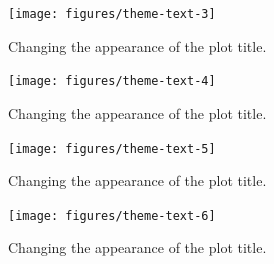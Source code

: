 \begin{figure}
\texttt{[image: figures/theme-text-3]} \caption{Changing the appearance of the plot title.\label{fig:theme-text3}}
\end{figure}

\begin{Shaded}
\begin{Highlighting}[]
\StringTok{ }\NormalTok{(} 
              \NormalTok{(} \NormalTok{, } \NormalTok{))}
\end{Highlighting}
\end{Shaded}

\begin{figure}
\texttt{[image: figures/theme-text-4]} \caption{Changing the appearance of the plot title.\label{fig:theme-text4}}
\end{figure}

\begin{Shaded}
\begin{Highlighting}[]
\StringTok{ }\NormalTok{(} 
              \NormalTok{(} \NormalTok{, } \NormalTok{))}
\end{Highlighting}
\end{Shaded}

\begin{figure}
\texttt{[image: figures/theme-text-5]} \caption{Changing the appearance of the plot title.\label{fig:theme-text5}}
\end{figure}

\begin{Shaded}
\begin{Highlighting}[]
\StringTok{ }\NormalTok{(} 
              \NormalTok{(} \NormalTok{, } \NormalTok{))}
\end{Highlighting}
\end{Shaded}

\begin{figure}
\texttt{[image: figures/theme-text-6]} \caption{Changing the appearance of the plot title.\label{fig:theme-text6}}
\end{figure}

